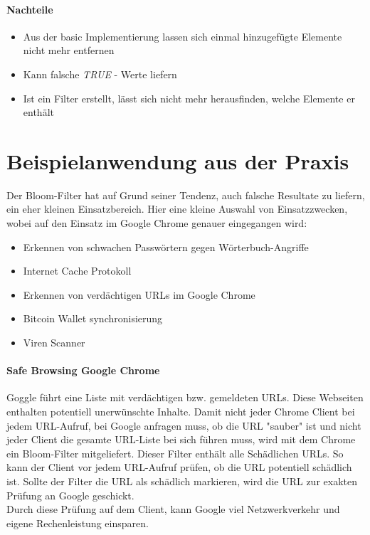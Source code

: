 \documentclass[12pt]{article}
\begin{document}
\paragraph*{Nachteile}
\begin{itemize}
\item Aus der basic Implementierung lassen sich einmal hinzugefügte Elemente nicht mehr entfernen
\item Kann falsche {\it TRUE} - Werte liefern
\item Ist ein Filter erstellt, lässt sich nicht mehr herausfinden, welche Elemente er enthält
\end{itemize}

\section*{Beispielanwendung aus der Praxis}
Der Bloom-Filter hat auf Grund seiner Tendenz,
auch falsche Resultate zu liefern, ein eher kleinen Einsatzbereich.
Hier eine kleine Auswahl von Einsatzzwecken,
wobei auf den Einsatz im Google Chrome genauer eingegangen wird:
\begin{itemize}
\item Erkennen von schwachen Passwörtern gegen Wörterbuch-Angriffe
\item Internet Cache Protokoll
\item Erkennen von verdächtigen URLs im Google Chrome
\item Bitcoin Wallet synchronisierung
\item Viren Scanner
\end{itemize}
\paragraph*{Safe Browsing Google Chrome}
Goggle führt eine Liste mit verdächtigen bzw. gemeldeten URLs.
Diese Webseiten enthalten potentiell unerwünschte Inhalte.
Damit nicht jeder Chrome Client bei jedem URL-Aufruf,
bei Google anfragen muss, ob die URL "sauber" ist und
nicht jeder Client die gesamte URL-Liste bei sich führen muss,
wird mit dem Chrome ein Bloom-Filter mitgeliefert.
Dieser Filter enthält alle Schädlichen URLs.
So kann der Client vor jedem URL-Aufruf prüfen,
ob die URL potentiell schädlich ist.
Sollte der Filter die URL als schädlich markieren,
wird die URL zur exakten Prüfung an Google geschickt.
\\
Durch diese Prüfung auf dem Client,
kann Google viel Netzwerkverkehr und eigene Rechenleistung einsparen.
\end{document}
